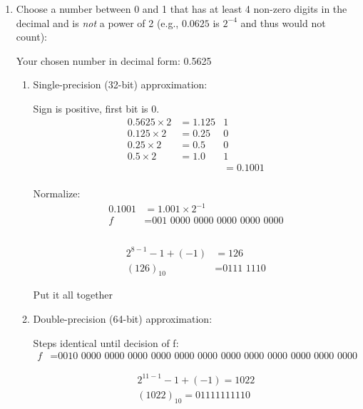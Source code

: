 \documentclass[11pt]{article}
\begin{document}
\begin{enumerate}
\item Choose a number between 0 and 1 that has at least 4 non-zero digits in the decimal and is
\emph{not} a power of 2 (e.g., \(0.0625\) is \(2^{-4}\) and thus would not count):

\vspace{0.125in}

Your chosen number in decimal form: 0.5625

\begin{enumerate}
\item Single-precision (32-bit) approximation:

Sign is positive, first bit is 0.\\
\begin{align*}
0.5625\times2&=1.125&1\\
0.125\times2&=0.25&0\\
0.25\times2&=0.5&0\\
0.5\times2&=1.0&1\\
&&=0.1001
\end{align*}\\

Normalize:\\
\begin{align*}
0.1001 &= 1.001\times2^{-1}\\
f&=\text{001 0000 0000 0000 0000 0000}\\
\end{align*}
\\[10pt]
\begin{align*}
2^{8-1} - 1 + (-1) &= 126\\
(126)_{10} &= \text{0111 1110} 
\end{align*}

Put it all together\\[10pt]

 

\item Double-precision (64-bit) approximation:

Steps identical until decision of f:\\[10pt]
\begin{align*}
f&=\text{0010 0000 0000 0000 0000 0000 0000 0000 0000 0000 0000 0000 0000}
\end{align*}

\begin{align*}
2^{11-1} - 1 + (-1) = 1022\\
(1022)_{10} = 011 1111 1110
\end{align*}


\end{enumerate}
\end{enumerate}
\end{document}
